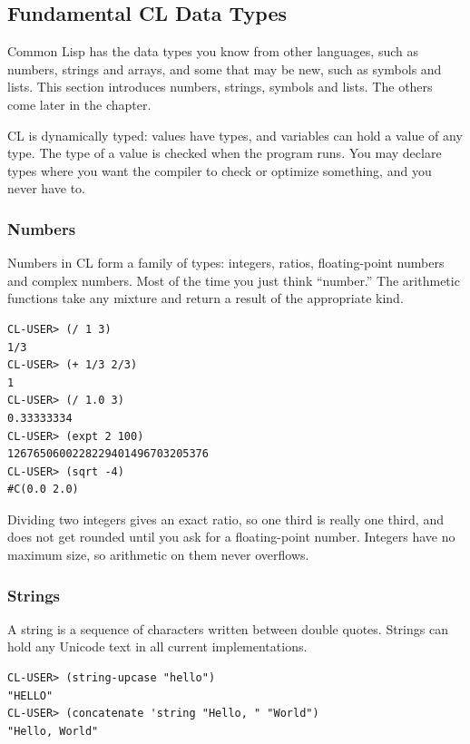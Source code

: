 \subsection{Fundamental CL Data Types}

Common Lisp has the data types you know from other languages, such as
numbers, strings and arrays, and some that may be new, such as
symbols and lists. This section introduces numbers, strings, symbols
and lists. The others come later in the chapter.

CL is dynamically typed: values have types, and variables can
hold a value of any type. The type of a value is checked when the
program runs. You may declare types where you want the compiler to
check or optimize something, and you never have to.

\subsubsection{Numbers}

Numbers in CL form a family of types: integers, ratios, floating-point
numbers and complex numbers. Most of the time you just think
``number.'' The arithmetic functions take any mixture and return a
result of the appropriate kind.

\begin{verbatim}
CL-USER> (/ 1 3)
1/3
CL-USER> (+ 1/3 2/3)
1
CL-USER> (/ 1.0 3)
0.33333334
CL-USER> (expt 2 100)
1267650600228229401496703205376
CL-USER> (sqrt -4)
#C(0.0 2.0)
\end{verbatim}

Dividing two integers gives an exact ratio, so one third is really
one third, and does not get rounded until you ask for a floating-point
number. Integers have no maximum size, so arithmetic on them never
overflows.

\subsubsection{Strings}

A string is a sequence of characters written between double quotes.
Strings can hold any Unicode text in all current implementations.

\begin{verbatim}
CL-USER> (string-upcase "hello")
"HELLO"
CL-USER> (concatenate 'string "Hello, " "World")
"Hello, World"
\end{verbatim}

